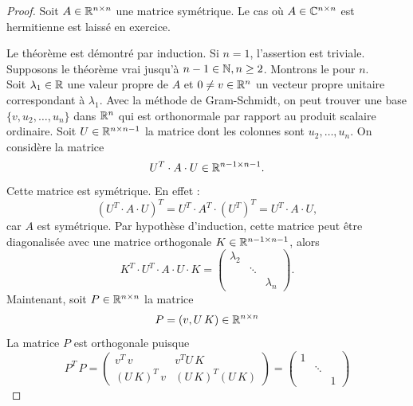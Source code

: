 \begin{proof}
  Soit $A \in \mathbb{R}^{n\times n}$
  une matrice symétrique. Le cas où $A \in \mathbb{C}^{n \times n}$
  est hermitienne est laissé en exercice.

  Le théorème est démontré par induction. Si $n=1$, l'assertion est triviale. \\
  Supposons le théorème vrai jusqu'à $n-1 \in \mathbb{N}, n \ge 2$. Montrons le pour $n$. \\
  Soit $\lambda_1 \in \mathbb{R}$
  une valeur propre de $A$
  et $0 \neq v \in \mathbb{R}^n$
  un vecteur propre unitaire correspondant à $\lambda_1$.
  Avec la méthode de Gram-Schmidt, on peut trouver une base
  $\{v,u_2,\dots,u_n\}$ dans $\mathbb{R}^n$ qui est orthonormale par rapport au produit scalaire ordinaire. Soit $U \in \mathbb{R}^{n \times n-1}$ la matrice dont les colonnes sont $u_2,\dots,u_n$.  On considère la matrice
  \begin{displaymath}
    U^T \cdot A \cdot U \in \mathbb{R}^{n-1 \times n-1}.
  \end{displaymath}
  Cette matrice est symétrique. En effet :
  \begin{displaymath}
    (U^T \cdot A \cdot U)^T = U^T \cdot A^T \cdot (U^T)^T = U^T \cdot A \cdot U,
  \end{displaymath}
  car $A$ est symétrique. Par hypothèse d'induction, cette matrice peut être diagonalisée  avec une matrice orthogonale  $K \in \mathbb{R}^{ n-1 \times n-1}$, alors 
  \begin{displaymath}
    K^T \cdot  U^T \cdot A \cdot U \cdot K =
    \begin{pmatrix}
      \lambda_2 \\
      & \ddots \\
      && \lambda_n
    \end{pmatrix}. 
  \end{displaymath}
Maintenant, soit $P \in \mathbb{R}^{n \times n}$ la matrice 
\begin{displaymath}
  P = \left( v, U\,K\right) \in \mathbb{R}^{n \times n}
\end{displaymath} 
La matrice $P$ est orthogonale puisque 
\begin{displaymath}
  P^T \, P =
  \begin{pmatrix}
    v^T \, v & v^T U \, K \\
    (U\,K)^T \, v &  (U\,K)^T (U\,K)
  \end{pmatrix} = 
  \begin{pmatrix}
    1 \\
    & \ddots \\
    && 1 

\end{pmatrix}
\end{displaymath}
\end{proof}

